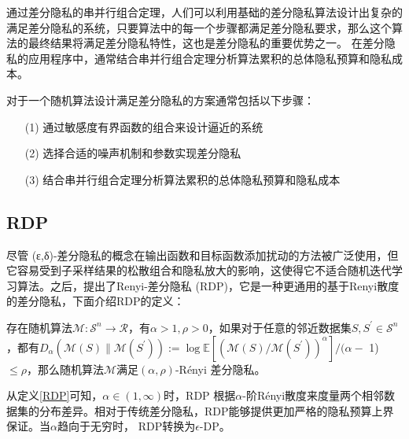通过差分隐私的串并行组合定理，人们可以利用基础的差分隐私算法设计出复杂的满足差分隐私的系统，只要算法中的每一个步骤都满足差分隐私要求，那么这个算法的最终结果将满足差分隐私特性，这也是差分隐私的重要优势之一。 在差分隐私的应用程序中，通常结合串并行组合定理分析算法累积的总体隐私预算和隐私成本。

对于一个随机算法设计满足差分隐私的方案通常包括以下步骤：
\begin{enumerate}
\item [(1)] 通过敏感度有界函数的组合来设计逼近的系统
\item [(2)] 选择合适的噪声机制和参数实现差分隐私
\item [(3)] 结合串并行组合定理分析算法累积的总体隐私预算和隐私成本
\end{enumerate}

\subsection{RDP}
尽管 (ε,δ)-差分隐私的概念在输出函数和目标函数添加扰动的方法被广泛使用，但它容易受到子采样结果的松散组合和隐私放大的影响，这使得它不适合随机迭代学习算法。之后，提出了Renyi-差分隐私 (RDP)，它是一种更通用的基于Renyi散度的差分隐私，下面介绍RDP的定义：

\begin{define}[RDP]\label{RDP}
存在随机算法$\mathcal{M}: \mathcal{S}^{n} \rightarrow \mathcal{R}$，有$\alpha>1, \rho>0$，如果对于任意的邻近数据集$S, S^{\prime} \in \mathcal{S}^{n}$，都有$D_{\alpha}\left(\mathcal{M}(S) \| \mathcal{M}\left(S^{\prime}\right)\right):=\log \mathbb{E}\left[\left(\mathcal{M}(S) / \mathcal{M}\left(S^{\prime}\right)\right)^{\alpha}\right] /(\alpha-$ 1) $\leq \rho$，那么随机算法$\mathcal{M}$满足$(\alpha, \rho)$-Rényi 差分隐私。
\end{define}

从定义\ref{RDP}可知，$\alpha \in(1, \infty)$时，RDP 根据$\alpha$-阶Rényi散度来度量两个相邻数据集的分布差异。相对于传统差分隐私，RDP能够提供更加严格的隐私预算上界保证。当$\alpha$趋向于无穷时， RDP转换为$\epsilon$-DP。


